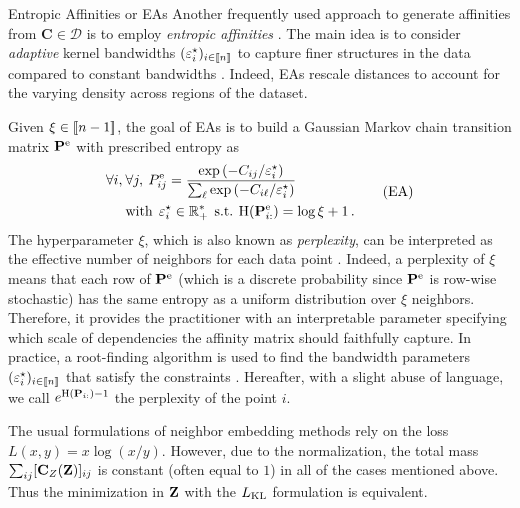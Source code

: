 \begin{mem1}{Entropic Affinities or EAs} 
Another frequently used approach to generate affinities from $\mathbf{C} \in \mathcal{D}$ is to employ \emph{entropic affinities}  \citep{hinton2002stochastic}. The main idea is to consider \emph{adaptive} kernel bandwidths $(\varepsilon^\star_i)_{i \in {[\![n]\!]}}$ to capture finer structures in the data compared to constant bandwidths \citep{van2018recovering}. Indeed, EAs rescale distances to account for the varying density across regions of the dataset.

Given $\xi \in {[\![n-1]\!]}$, the goal of EAs is to build a Gaussian Markov chain transition matrix $\mathbf{P}^{\mathrm{e}}$ with prescribed entropy as
\begin{equation}
\begin{split}
    \forall i, \: &\forall j, \: P^{\mathrm{e}}_{ij} = \frac{\exp{(-C_{ij}/\varepsilon^\star_i)}}{\sum_\ell \exp{(-C_{i\ell}/\varepsilon^\star_i)}} \\
    &\text{with} \:\: \varepsilon^\star_i \in \mathbb{R}^*_+ \:\: \text{s.t.} \: \operatorname{H}(\mathbf{P}^{\mathrm{e}}_{i:}) = \log{\xi} + 1\,. \label{eq:entropic_affinity_pb}
\end{split}\tag{EA}
\end{equation}
The hyperparameter $\xi$, which is also known as \emph{perplexity}, can be interpreted as the effective number of neighbors for each data point \citep{vladymyrov2013entropic}. Indeed, a perplexity of $\xi$ means that each row of $\mathbf{P}^{\mathrm{e}}$ (which is a discrete probability since $\mathbf{P}^{\mathrm{e}}$ is row-wise stochastic) has the same entropy as a uniform distribution over $\xi$ neighbors. Therefore, it provides the practitioner with an interpretable parameter specifying which scale of dependencies the affinity matrix should faithfully capture. In practice, a root-finding algorithm is used to find the bandwidth parameters $(\varepsilon_i^\star)_{i \in {[\![n]\!]}}$ that satisfy the constraints \citep{vladymyrov2013entropic}. Hereafter, with a slight abuse of language, we call $e^{\operatorname{H}(\mathbf{P}_{i:})-1}$ the perplexity of the point $i$.
\end{mem1}

The usual formulations of neighbor embedding methods rely on the loss $L(x,y) = x \log(x/y)$. However, due to the normalization, the total mass $\sum_{ij} [{\mathbf{C}}_Z({\mathbf{Z}})]_{ij}$ is constant (often equal to $1$) in all of the cases mentioned above. Thus the minimization in ${\mathbf{Z}}$ with the $L_{\operatorname{KL}}$ formulation is equivalent.

